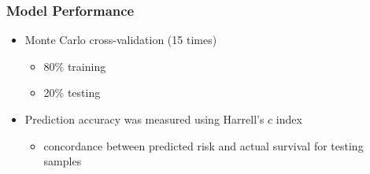 \documentclass[usenames,dvipsnames]{beamer}
\begin{document}
\begin{frame}
  \frametitle{Model Performance}
  \begin{itemize}
    \item Monte Carlo cross-validation (15 times)
    \begin{itemize}
      \item 80\% training
      \item 20\% testing
    \end{itemize}
    \item Prediction accuracy was measured using Harrell's $c$ index
    \begin{itemize}
      \item concordance between predicted risk and actual survival for testing samples
    \end{itemize}
  \end{itemize}
\end{frame}
\end{document}
